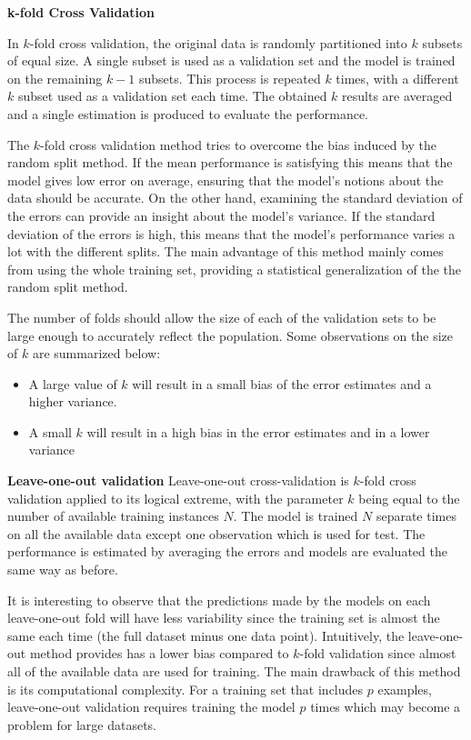\documentclass{article}
\begin{document}
\textbf{k-fold Cross Validation}

In $k$-fold cross validation, the original data is randomly partitioned into $k$ subsets of equal size. A single subset is used as a validation set and the model is trained on the remaining $k-1$ subsets. This process is repeated $k$ times, with a different $k$ subset used as a validation set each time. The obtained $k$ results are averaged and a single estimation is produced to evaluate the performance.

The $k$-fold cross validation method tries to overcome the bias induced by the random split method. If the mean performance is satisfying this means that the model gives low error on average, ensuring that the model's notions about the data should be accurate. On the other hand, examining the standard deviation of the errors can provide an insight about the model's variance. If the standard deviation of the errors is high, this means that the model's performance varies a lot with the different splits. The main advantage of this method mainly comes from using the whole training set, providing a statistical generalization of the the random split method.

The number of folds should allow the size of each of the validation sets to be large enough to accurately reflect the population. Some observations on the size of $k$ are summarized below:

\begin{itemize}

\item A large value of $k$ will result in a small bias of the error estimates and a higher variance.
\item A small $k$ will result in a high bias in the error estimates and in a lower variance


\end{itemize}





\textbf{Leave-one-out validation} Leave-one-out cross-validation is $k$-fold cross validation applied to its logical extreme, with the parameter $k$ being equal to the number of available training instances $N$. The model is trained $N$ separate times on all the available data except one observation which is used for test. The performance is estimated by averaging the errors and models are evaluated the same way as before.

 It is interesting to observe that the predictions made by the models on each leave-one-out fold will have less variability since the training set is almost the same each time (the full dataset minus one data point). Intuitively, the leave-one-out method provides has a lower bias compared to $k$-fold validation since almost all of the available data are used for training.  The main drawback of this method is its computational complexity. For a training set that includes $p$ examples, leave-one-out validation requires training the model $p$ times which may become a problem for large datasets.
\end{document}
